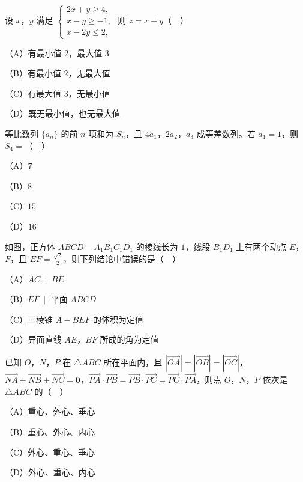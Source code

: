 \begin{question}
设 $x$，$y$ 满足 $\begin{cases}2x+y\geqslant4,\\ x-y\geqslant-1,\\ x-2y\leqslant2,\end{cases}$ 则 $z=x+y$（　）

（A）有最小值 $2$，最大值 $3$

（B）有最小值 $2$，无最大值

（C）有最大值 $3$，无最小值

（D）既无最小值，也无最大值

\end{question}
\begin{question}
等比数列 $\{a_n\}$ 的前 $n$ 项和为 $S_n$，且 $4a_1$，$2a_2$，$a_3$ 成等差数列。若 $a_1=1$，则 $S_4=$（　）

（A）$7$

（B）$8$

（C）$15$

（D）$16$

\Needspace{0.4\textheight}
\end{question}
\begin{question}
如图，正方体 $ABCD-A_1B_1C_1D_1$ 的棱线长为 $1$，线段 $B_1D_1$ 上有两个动点 $E$，$F$，且 $EF=\frac{\sqrt2}{2}$，则下列结论中错误的是（　）
\nopagebreak[4]
\begin{center}\end{center}
\nopagebreak[4]
（A）$AC\perp BE$

（B）$EF\parallel$ 平面 $ABCD$

（C）三棱锥 $A-BEF$ 的体积为定值

（D）异面直线 $AE$，$BF$ 所成的角为定值

\end{question}
\begin{question}
已知 $O$，$N$，$P$ 在 $\triangle ABC$ 所在平面内，且 $\left|\overrightarrow{OA}\right|=\left|\overrightarrow{OB}\right|=\left|\overrightarrow{OC}\right|$，$\overrightarrow{NA}+\overrightarrow{NB}+\overrightarrow{NC}=\mathbf 0$，$\overrightarrow{PA}\cdot\overrightarrow{PB}=\overrightarrow{PB}\cdot\overrightarrow{PC}=\overrightarrow{PC}\cdot\overrightarrow{PA}$，则点 $O$，$N$，$P$ 依次是 $\triangle ABC$ 的（　）

（A）重心、外心、垂心

（B）重心、外心、内心

（C）外心、重心、垂心

（D）外心、重心、内心

\Needspace{0.4\textheight}
\end{question}
